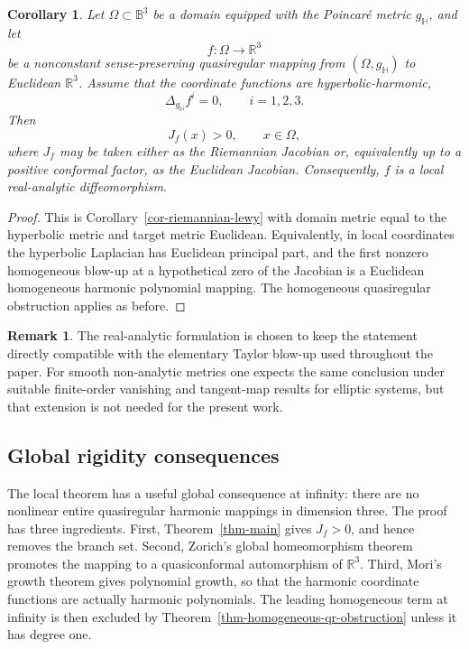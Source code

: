 \documentclass[10pt]{amsart}
\numberwithin{equation}{section}
\newtheorem{corollary}[theorem]{Corollary}
\theoremstyle{definition}
\newtheorem{remark}{Remark}[section]
\newcommand{\R}{\mathbb R}
\newcommand{\B}{\mathbb B}
\begin{document}
\begin{corollary}
\label{cor-hyperbolic-lewy}
Let \(\Omega\subset\B^3\) be a domain equipped with the Poincar\'e metric
\(g_{\mathbb H}\), and let
\[
        f:\Omega\to\R^3
\]
be a nonconstant sense-preserving quasiregular mapping from
\((\Omega,g_{\mathbb H})\) to Euclidean \(\R^3\). Assume that the coordinate
functions are hyperbolic-harmonic,
\[
        \Delta_{g_{\mathbb H}}f^i=0,
        \qquad i=1,2,3.
\]
Then
\[
        J_f(x)>0,
        \qquad x\in\Omega,
\]
where \(J_f\) may be taken either as the Riemannian Jacobian or,
equivalently up to a positive conformal factor, as the Euclidean Jacobian.
Consequently, \(f\) is a local real-analytic diffeomorphism.
\end{corollary}

\begin{proof}
This is Corollary~\ref{cor-riemannian-lewy} with domain metric equal to the
hyperbolic metric and target metric Euclidean. Equivalently, in local
coordinates the hyperbolic Laplacian has Euclidean principal part, and the
first nonzero homogeneous blow-up at a hypothetical zero of the Jacobian is a
Euclidean homogeneous harmonic polynomial mapping. The homogeneous quasiregular
obstruction applies as before.
\end{proof}

\begin{remark}
The real-analytic formulation is chosen to keep the statement directly
compatible with the elementary Taylor blow-up used throughout the paper. For
smooth non-analytic metrics one expects the same conclusion under suitable
finite-order vanishing and tangent-map results for elliptic systems, but that
extension is not needed for the present work.
\end{remark}


\subsection{Global rigidity consequences}

The local theorem has a useful global consequence at infinity: there are no
nonlinear entire quasiregular harmonic mappings in dimension three. The proof
has three ingredients. First, Theorem~\ref{thm-main} gives \(J_f>0\), and hence removes the branch set.
Second, Zorich's global homeomorphism theorem promotes the mapping to a
quasiconformal automorphism of \(\R^3\). Third, Mori's growth theorem gives
polynomial growth, so that the harmonic coordinate functions are actually
harmonic polynomials. The leading homogeneous term at infinity is then
excluded by Theorem~\ref{thm-homogeneous-qr-obstruction} unless it has degree
one.
\end{document}
